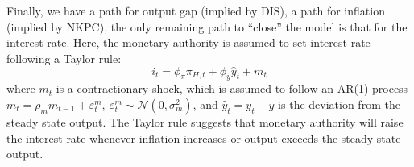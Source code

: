 Finally, we have a path for output gap (implied by DIS), a path for inflation (implied by NKPC), the only remaining path to ``close'' the model is that for the interest rate. Here, the monetary authority is assumed to set interest rate following a Taylor rule:
\begin{equation}
    i_t = \phi_\pi \pi_{H,t}+ \phi_y \hat{y}_t + m_t
\end{equation}
where $m_t$ is a contractionary shock, which is assumed to follow an AR(1) process $m_t = \rho_m m_{t-1} + \varepsilon^m_{t},\ \varepsilon^m_{t} \sim \mathcal{N}(0,\sigma^2_m)$, and $\hat{y}_t = y_t - y$ is the deviation from the steady state output. The Taylor rule suggests that monetary authority will raise the interest rate whenever inflation increases or output exceeds the steady state output.